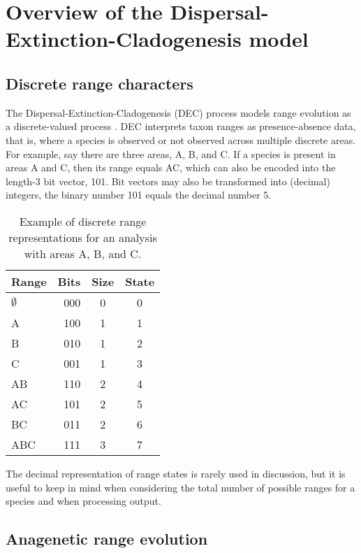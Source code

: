 \section{Overview of the Dispersal-Extinction-Cladogenesis model} \label{sec:bg_intro2}

\subsection*{Discrete range characters}

The Dispersal-Extinction-Cladogenesis (DEC) process models range evolution as a discrete-valued process \citep{Ree2005, Ree2008}.
DEC interprets taxon ranges as presence-absence data, that is, where a species is observed or not observed across multiple discrete areas.
For example, say there are three areas, A, B, and C.
If a species is present in areas A and C, then its range equals AC, which can also be encoded into the length-3 bit vector, 101.
Bit vectors may also be transformed into (decimal) integers, \EG the binary number 101 equals the decimal number 5.

\begin{table}[!ht]
\scriptsize
\centering
\begin{tabular}{lrcc}
Range & Bits & Size & State \\ \hline
$\emptyset$ & 000 & 0 & 0 \\
          A & 100 & 1 & 1 \\
          B & 010 & 1 & 2 \\
          C & 001 & 1 & 3 \\
         AB & 110 & 2 & 4 \\
         AC & 101 & 2 & 5 \\
         BC & 011 & 2 & 6 \\
        ABC & 111 & 3 & 7 \\
\end{tabular}
\caption{Example of discrete range representations for an analysis with areas A, B, and C.}
\end{table}

The decimal representation of range states is rarely used in discussion, but it is useful to keep in mind when considering the total number of possible ranges for a species and when processing output.

\subsection*{Anagenetic range evolution}


